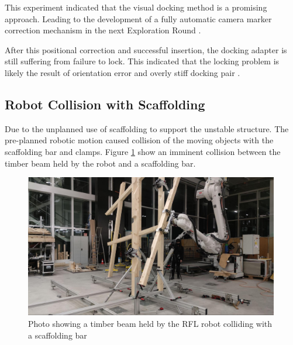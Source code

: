 This experiment indicated that the visual docking method is a promising approach. Leading to the development of a fully automatic camera marker correction mechanism in the next Exploration Round .

After this positional correction and successful insertion, the docking adapter is still suffering from failure to lock. This indicated that the locking problem is likely the result of orientation error and overly stiff docking pair .

\subsection{Robot Collision with Scaffolding}
\label{subsection:exploration-3-robot-collision-with-scaffolding}

Due to the unplanned use of scaffolding to support the unstable structure. The pre-planned robotic motion caused collision of the moving objects with the scaffolding bar and clamps. Figure \ref{fig:robot-colliding-with-scaffolding-bar} show an imminent collision between the timber beam held by the robot and a scaffolding bar.

\begin{figure}[!h]
    \centering
    \includegraphics[width=0.99\textwidth]{images/6b/img13.jpg}
    \caption{Photo showing a timber beam held by the RFL robot colliding with a scaffolding bar}
    \label{fig:robot-colliding-with-scaffolding-bar}
\end{figure}


